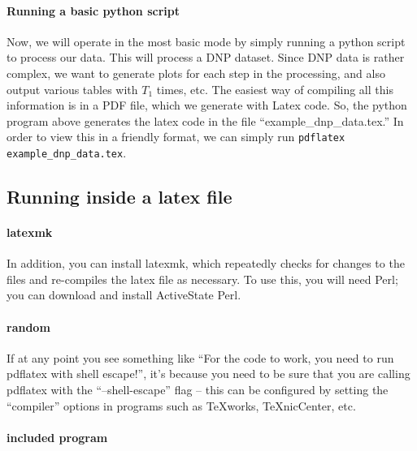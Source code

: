 \paragraph{Running a basic python script}
Now, we will operate in the most basic mode by simply running
    a python script to process our data.
This will process a DNP dataset.
Since DNP data is rather complex,
    we want to generate plots for each step in the processing,
    and also output various tables with $T_1$ times, etc.
The easiest way of compiling all this information
    is in a PDF file, which we generate with Latex code.
So, the python program above generates the latex code
    in the file ``example\_dnp\_data.tex.''
In order to view this in a friendly format,
    we can simply run \texttt{pdflatex example\_dnp\_data.tex}.
\subsection{Running inside a latex file}
\paragraph{latexmk}
In addition, you can install latexmk, which repeatedly checks for
    changes to the files and re-compiles the latex file as necessary.
To use this, you will need Perl; you can download and install
    ActiveState Perl.
\paragraph{random}
If at any point you see something like ``For the code to work, you need to run pdflatex with shell escape!'', 
    it's because you need to be sure that you are calling pdflatex with the ``--shell-escape'' flag -- this can be configured by setting the ``compiler'' options in programs such as TeXworks, TeXnicCenter, etc.
\paragraph{included program}
